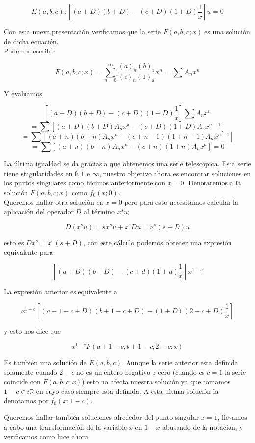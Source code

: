 $$E(a,b,c): [(a+D)(b+D)- (c+D)(1+D)\frac{1}{x}]u=0$$

Con esta nueva presentaci\'on verificamos que la serie $F(a,b,c;x)$ es una soluci\'on de dicha ecuaci\'on. \\

Podemos escribir

$$F(a,b,c;x)= \sum_{n=0}^{\infty } \frac{(a)_{n} (b)_{n}}{(c)_{n}(1)_{n}} x^{n} = \sum A_{n} x^{n}$$

Y evaluamos

$$[(a+D)(b+D)- (c+D)(1+D)\frac{1}{x}] \sum A_{n}x^{n}$$
$$= \sum [(a+D)(b+D)A_{n}x^{n}- (c+D)(1+D)A_{n}x^{n-1}]$$
$$= \sum [(a+n)(b+n)A_{n}x^{n}- (c+n-1)(1+n-1)A_{n}x^{n-1}]$$
$$= \sum [(a+n)(b+n)A_{n}x^{n}- (c+n)(1+n)A_{n}x^{n}]=0$$


La \'ultima igualdad se da gracias a que obtenemos una serie telesc\'opica. Esta serie tiene singularidades en $0,1$ e $\infty$, nuestro objetivo ahora es encontrar soluciones en los puntos singulares como hicimos anteriormente con $x=0$. Denotaremos  a la soluci\'on  $F(a,b,c;x)$ como $f_{0}(x;0)$. \\

Queremos hallar otra soluci\'on en $x=0$ pero para esto necesitamos calcular la aplicaci\'on del operador $D$ al t\'ermino $x^{s} u$;

$$D(x^{s}u)= sx^{s}u + x^{s}Du = x^{s}(s +D)u$$

esto es $Dx^{s}= x^{s} (s + D)$, con este c\'alculo podemos obtener una expresi\'on equivalente para

$$[(a+D)(b+D) - (c+d)(1+d) \frac{1}{x}] x^{1-c} $$

La expresi\'on anterior es equivalente a

$$x^{1-c}[(a+1-c+D)(b+1-c+D)-(1+D)(2-c+D)\frac{1}{x}]$$

y esto nos dice que

$$x^{1-c} F(a+1-c,b+1-c,2-c:x) $$

Es tambi\'en una soluci\'on de $E(a,b,c)$. Aunque la serie anterior esta definida solamente cuando $2-c$ no es un entero negativo o cero (cuando es $c=1$ la serie  coincide con $F(a,b,c;x)$) esto no afecta nuestra soluci\'on ya que tomamos $1-c \in i\mathbb{R}$ en cuyo caso siempre esta definida. A esta ultima soluci\'on la denotamos por $f_{0}(x;1-c)$.

Queremos hallar tambi\'en soluciones alrededor del punto singular $x=1$, llevamos a cabo una transformaci\'on de la variable $x$ en $1-x$ abusando de la notaci\'on, y verificamos como luce ahora

